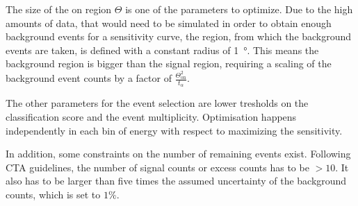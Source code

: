The size of the on region $\Theta$ is one of the parameters to optimize.
Due to the high amounts of data, that would need to be simulated 
in order to obtain enough background events for a sensitivity curve,
the region, from which the background events are taken, is defined
with a constant radius of \SI{1}{\degree}.
This means the background region is bigger
than the signal region, requiring a scaling of the background
event counts by a factor of
$\frac{\Theta_\text{on}^{2}}{t_{\alpha}}$.

The other parameters for the event selection are lower tresholds on
the classification score and the event multiplicity.
Optimisation happens independently in each bin of energy
with respect to maximizing the sensitivity.

In addition, some constraints on the number of remaining events exist.
Following CTA guidelines, the number of signal counts or excess counts
has to be $>10$. It also has to be larger than five times the assumed uncertainty
of the background counts, which is set to $1\%$.










